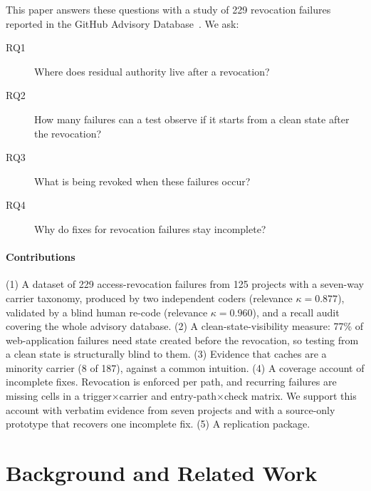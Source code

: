 \documentclass[preprint,12pt]{elsarticle}
\begin{document}
This paper answers these questions with a study of 229 revocation failures reported in the GitHub Advisory
Database~\cite{ghadvisorydb}. We ask:

\begin{description}
\item[RQ1] Where does residual authority live after a revocation?
\item[RQ2] How many failures can a test observe if it starts from a clean state after the revocation?
\item[RQ3] What is being revoked when these failures occur?
\item[RQ4] Why do fixes for revocation failures stay incomplete?
\end{description}

\paragraph{Contributions}
(1) A dataset of 229 access-revocation failures from 125 projects with a seven-way
carrier taxonomy, produced by two independent coders (relevance $\kappa=0.877$), validated by a blind human
re-code (relevance $\kappa=0.960$), and a recall audit covering the whole advisory database. (2) A clean-state-visibility measure: 77\% of web-application failures need
state created before the revocation, so testing from a clean state is structurally blind to them.
(3) Evidence that caches are a minority carrier (8 of 187), against a common intuition.
(4) A coverage account of incomplete fixes. Revocation is enforced per path, and recurring
failures are missing cells in a trigger$\times$carrier and entry-path$\times$check matrix. We support this
account with verbatim evidence from seven projects and with a source-only prototype that recovers one incomplete
fix. (5) A replication package.

\section{Background and Related Work}
\end{document}

